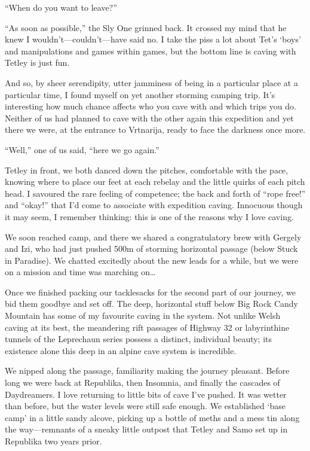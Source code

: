 ``When do you want to leave?''

``As soon as possible,'' the Sly One grinned back. It crossed my mind
that he knew I wouldn't---couldn't---have said no. I take the piss a lot
about Tet's `boys' and manipulations and games within games, but the
bottom line is caving with Tetley is just fun.

And so, by sheer serendipity, utter jamminess of being in a particular
place at a particular time, I found myself on yet another storming
camping trip. It's interesting how much chance affects who you cave with
and which trips you do. Neither of us had planned to cave with the other
again this expedition and yet there we were, at the entrance to
Vrtnarija, ready to face the darkness once more.

``Well,'' one of us said, ``here we go again.''

Tetley in front, we both danced down the pitches, comfortable with the
pace, knowing where to place our feet at each rebelay and the little
quirks of each pitch head. I savoured the rare feeling of competence;
the back and forth of ``rope free!'' and ``okay!'' that I'd come to
associate with expedition caving. Innocuous though it may seem, I
remember thinking: this is one of the reasons why I love caving.

We soon reached camp, and there we shared a congratulatory brew with
Gergely and Izi, who had just pushed 500m of storming horizontal passage
(below Stuck in Paradise). We chatted excitedly about the new leads for
a while, but we were on a mission and time was marching on\ldots{}

Once we finished packing our tacklesacks for the second part of our
journey, we bid them goodbye and set off. The deep, horizontal stuff
below Big Rock Candy Mountain has some of my favourite caving in the
system. Not unlike Welsh caving at its best, the meandering rift
passages of Highway 32 or labyrinthine tunnels of the Leprechaun series
possess a distinct, individual beauty; its existence alone this deep in
an alpine cave system is incredible.

We nipped along the passage, familiarity making the journey pleasant.
Before long we were back at Republika, then Insomnia, and finally the
cascades of Daydreamers. I love returning to little bits of cave I've
pushed. It was wetter than before, but the water levels were still safe
enough. We established `base camp' in a little sandy alcove, picking up
a bottle of meths and a mess tin along the way---remnants of a sneaky
little outpost that Tetley and Samo set up in Republika two years prior.

